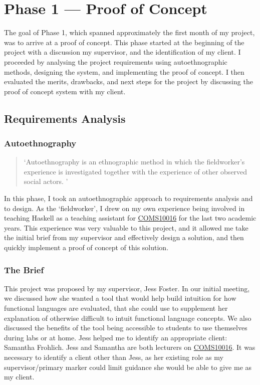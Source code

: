 \chapter{Phase 1 --- Proof of Concept}
The goal of Phase 1, which spanned approximately the first month of my project, was to arrive at a proof of concept. This phase started at the beginning of the project with a discussion my supervisor, and the identification of my client. I proceeded by analysing the project requirements using autoethnographic methods, designing the system, and implementing the proof of concept. I then evaluated the merits, drawbacks, and next steps for the project by discussing the proof of concept system with my client. 

\section{Requirements Analysis}
\subsection{Autoethnography}
\label{sec:c1_autoethnography}
\begin{quote}
`Autoethnography is an ethnographic method in which the fieldworker's experience is investigated together with the experience of other observed social actors. \cite{autoethnography}'
\end{quote}

\noindent In this phase, I took an autoethnographic approach to requirements analysis and to design. As the `fieldworker', I drew on my own experience being involved in teaching Haskell as a teaching assistant for \hyperref[COMS10016]{COMS10016} for the last two academic years. This experience was very valuable to this project, and it allowed me take the initial brief from my supervisor and effectively design a solution, and then quickly implement a proof of concept of this solution. 

\subsection{The Brief}
This project was proposed by my supervisor, Jess Foster. In our initial meeting, we discussed how she wanted a tool that would help build intuition for how functional languages are evaluated, that she could use to supplement her explanation of otherwise difficult to intuit functional language concepts. We also discussed the benefits of the tool being accessible to students to use themselves during labs or at home. Jess helped me to identify an appropriate client: Samantha Frohlich. Jess and Samantha are both lecturers on \hyperref[COMS10016]{COMS10016}. It was necessary to identify a client other than Jess, as her existing role as my supervisor/primary marker could limit guidance she would be able to give me as my client. 

